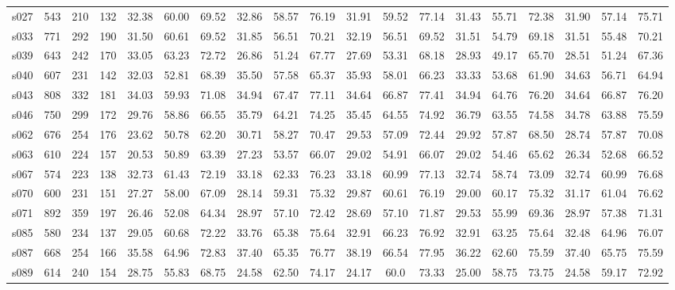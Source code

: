 \begin{table*}[ht!]
{\begin{tabular}{cccc|ccc|ccc|ccc|ccc|ccc}
s027 & 543& 210& 132 & 32.38 & 60.00 & 69.52 & 32.86 &58.57 & 76.19  & 31.91 & 59.52& 77.14 &31.43 & 55.71&72.38 & 31.90 &57.14 & 75.71\\
s033  & 771 & 292 & 190 & 31.50& 60.61 & 69.52  & 31.85 &56.51 & 70.21  & 32.19  & 56.51  & 69.52 &31.51 &54.79 &69.18 & 31.51 &55.48 & 70.21\\
s039    & 643    & 242 & 170 & 33.05 & 63.23 & 72.72 & 26.86 &51.24 & 67.77  & 27.69 & 53.31 & 68.18 &28.93&49.17 &65.70 & 28.51 &51.24 & 67.36\\ \hline
s040 & 607 & 231 & 142  & 32.03 & 52.81 & 68.39 & 35.50 &57.58 & 65.37  & 35.93  & 58.01  & 66.23  &33.33 &53.68 & 61.90& 34.63 &56.71 & 64.94\\
s043 & 808 & 332& 181  & 34.03  & 59.93    & 71.08  & 34.94 &67.47 & 77.11  & 34.64   & 66.87   & 77.41 &34.94&64.76 &76.20 & 34.64 &66.87 & 76.20\\
s046  & 750 & 299  & 172   & 29.76 & 58.86 & 66.55 &35.79 &64.21 & 74.25  & 35.45   & 64.55    & 74.92 &36.79 &63.55&74.58 &34.78 &63.88 & 75.59\\
s062  & 676  & 254  & 176 & 23.62 & 50.78 & 62.20 & 30.71 &58.27 & 70.47 & 29.53 & 57.09 & 72.44 &29.92 &57.87 &68.50 &28.74 &57.87 & 70.08\\
s063 & 610 & 224   & 157& 20.53 & 50.89  & 63.39 & 27.23 &53.57 & 66.07 & 29.02 & 54.91  & 66.07 &29.02 &54.46 & 65.62& 26.34 &52.68 & 66.52\\ \hline
s067& 574   & 223  & 138    & 32.73 & 61.43 & 72.19 & 33.18 &62.33 & 76.23  &33.18& 60.99& 77.13 &32.74 &58.74 &73.09 & 32.74 &60.99 & 76.68\\
s070   & 600   & 231  & 151& 27.27  & 58.00 & 67.09   &  28.14 &59.31 & 75.32  &  29.87 & 60.61& 76.19 &29.00 & 60.17&75.32 &31.17 &61.04 & 76.62\\
 s071   & 892 & 359& 197   & 26.46 & 52.08 & 64.34& 28.97 &57.10 & 72.42  & 28.69 & 57.10& 71.87&29.53 &55.99 &69.36 & 28.97 &57.38 & 71.31 \\
s085  & 580  & 234    & 137  & 29.05    & 60.68    & 72.22    & 33.76 &65.38 & 75.64  & 32.91    & 66.23    & 76.92 &32.91 &63.25 &75.64 &32.48 &64.96 & 76.07 \\
s087 & 668     & 254  & 166   & 35.58   & 64.96    & 72.83  & 37.40 &65.35 & 76.77  &38.19   & 66.54     & 77.95  &36.22 &62.60&75.59 & 37.40 &65.75 & 75.59\\ \hline
s089   & 614  & 240  & 154   & 28.75    & 55.83   & 68.75 &  24.58 &62.50 & 74.17 & 24.17 & 60.0 & 73.33 &25.00 &58.75 & 73.75& 24.58 &59.17 & 72.92\\

\end{tabular}}
\end{table*}
